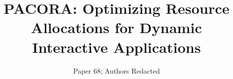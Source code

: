 \documentclass[pageno]{jpaper}
\newcommand{\pacora}{PACORA\xspace}
\begin{document}
\title{\pacora: Optimizing Resource Allocations for Dynamic Interactive Applications}
\author{Paper 68; Authors Redacted}
\date{}
\maketitle

\thispagestyle{empty}








%







\appendix





\end{document}
